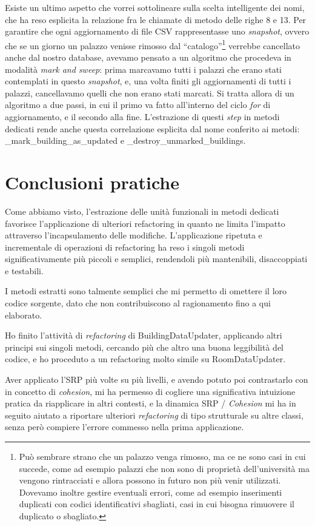 \documentclass[12pt]{report}
\begin{document}
Esiste un ultimo aspetto che vorrei sottolineare sulla scelta intelligente
dei nomi, che ha reso esplicita la relazione fra le chiamate 
di metodo delle righe 8 e 13. Per garantire che ogni aggiornamento di
file CSV rappresentasse uno \textit{snapshot}, ovvero che se un giorno un
palazzo venisse rimosso dal ``catalogo''\footnote{
Può sembrare strano che un palazzo venga rimosso, ma ce ne sono casi in cui
succede, come ad esempio palazzi che non sono di proprietà dell'università
ma vengono rintracciati e allora possono in futuro non più venir utilizzati. 
Dovevamo inoltre gestire eventuali errori, come ad esempio inserimenti duplicati
con codici identificativi sbagliati, casi in cui bisogna rimuovere il duplicato
o sbagliato.
}
verrebbe cancellato anche dal nostro database, avevamo pensato a un algoritmo
che procedeva in modalità \textit{mark and sweep}: prima marcavamo tutti i palazzi
che erano stati contemplati in questo \textit{snapshot}, e, una volta
finiti gli aggiornamenti di tutti i palazzi, cancellavamo quelli
che non erano stati marcati. Si tratta allora di un algoritmo a due passi,
in cui il primo va fatto all'interno del ciclo \textit{for} di
aggiornamento, e il 
secondo alla fine. L'estrazione di questi \textit{step} in metodi dedicati
rende anche questa correlazione esplicita dal nome conferito ai metodi:
\_mark\_building\_as\_updated e \_destroy\_unmarked\_buildings.


\section{Conclusioni pratiche}

Come abbiamo visto, l'estrazione delle unità funzionali in metodi dedicati
favorisce l'applicazione di ulteriori refactoring in quanto ne limita 
l'impatto attraverso l'incapsulamento delle modifiche.
L'applicazione ripetuta e incrementale di operazioni di refactoring
ha reso i singoli metodi significativamente più piccoli e
semplici, rendendoli più mantenibili, disaccoppiati e testabili.

I metodi estratti sono talmente semplici che mi permetto di omettere 
il loro codice sorgente, dato che non contribuiscono al ragionamento 
fino a qui elaborato.

Ho finito l'attività di \textit{refactoring} di BuildingDataUpdater,
applicando altri principi sui singoli metodi, cercando più che altro
una buona leggibilità del codice,
e ho proceduto a un refactoring molto simile su RoomDataUpdater. 

Aver applicato l'SRP più volte su più livelli, e avendo potuto poi 
contrastarlo con in concetto di \textit{cohesion}, mi ha permesso 
di cogliere una significativa intuizione pratica da riapplicare in 
altri contesti, e la dinamica SRP / \textit{Cohesion} mi ha in seguito 
aiutato a riportare ulteriori \textit{refactoring} di tipo strutturale 
su altre classi, senza però compiere l'errore commesso nella 
prima applicazione.
\end{document}
